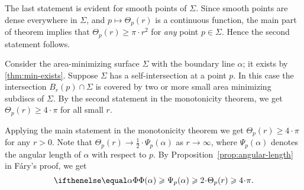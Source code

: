 The last statement is evident for smooth points of $\Sigma$.
Since smooth points are dense everywhere in $\Sigma$, and $p\mapsto \Theta_p(r)$ is a continuous function,
the main part of theorem implies that $\Theta_p(r)\ge\pi\cdot r^2$ for \emph{any} point $p\in\Sigma$.
Hence the second statement follows.
\qeds

Consider the area-minimizing surface $\Sigma$ with the boundary line $\alpha$; it exists by \ref{thm:min-exists}.
Suppose $\Sigma$ has a self-intersection at a point $p$.
In this case the intersection $B_r(p)\cap \Sigma$ is covered by two or more small area minimizing subdiscs of $\Sigma$.
By the second statement in the monotonicity theorem, we get $\Theta_p(r)\ge 4\cdot\pi$ for all small $r$.

Applying the main statement in the monotonicity theorem we get $\Theta_p(r)\ge 4\cdot\pi$ for any $r>0$.
Note that $\Theta_p(r)\to\tfrac12\cdot\Psi_p(\alpha)$ as $r\to \infty$,
where $\Psi_p(\alpha)$ denotes the angular length of $\alpha$ with respect to $p$.
By Proposition~\ref{prop:angular-length} in F\'ary's proof, we get
\[\tc{\alpha}\ge \Psi_p(\alpha)\ge 2\cdot \Theta_p(r)\ge 4\cdot\pi.\]
\qedsf


